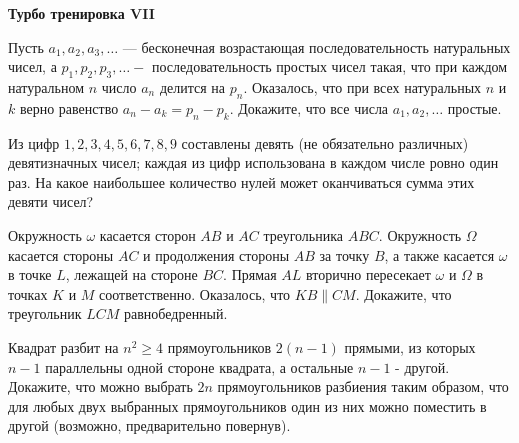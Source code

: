 \centerline{\bf \Huge Турбо тренировка VII}
\centerline{\bf \Huge }

\begin{flushright}
        \scriptsize{}
\end{flushright}

Пусть $a_1, a_2, a_3, \ldots$ --- бесконечная возрастающая последовательность натуральных чисел, а $p_1, p_2, p_3, \ldots-$ последовательность простых чисел такая, что при каждом натуральном $n$ число $a_n$ делится на $p_n$. Оказалось, что при всех натуральных $n$ и $k$ верно равенство $a_n-a_k=p_n-p_k$. Докажите, что все числа $a_1, a_2, \ldots$ простые.

Из цифр $1,2,3,4,5,6,7,8,9$ составлены девять (не обязательно различных) девятизначных чисел; каждая из цифр использована в каждом числе ровно один раз. На какое наибольшее количество нулей может оканчиваться сумма этих девяти чисел?

Окружность $\omega$ касается сторон $A B$ и $A C$ треугольника $A B C$. Окружность $\Omega$ касается стороны $A C$ и продолжения стороны $A B$ за точку $B$, а также касается $\omega$ в точке $L$, лежащей на стороне $B C$. Прямая $A L$ вторично пересекает $\omega$ и $\Omega$ в точках $K$ и $M$ соответственно. Оказалось, что $K B \| C M$. Докажите, что треугольник $L C M$ равнобедренный.

Квадрат разбит на $n^2 \geqslant 4$ прямоугольников $2(n-1)$ прямыми, из которых $n-1$ параллельны одной стороне квадрата, а остальные $n-1$ - другой. Докажите, что можно выбрать $2 n$ прямоугольников разбиения таким образом, что для любых двух выбранных прямоугольников один из них можно поместить в другой (возможно, предварительно повернув).